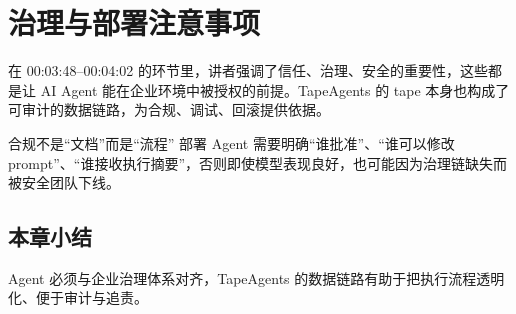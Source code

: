 \section{治理与部署注意事项}
在 00:03:48--00:04:02 的环节里，讲者强调了信任、治理、安全的重要性，这些都是让 AI Agent 能在企业环境中被授权的前提。TapeAgents 的 tape 本身也构成了可审计的数据链路，为合规、调试、回滚提供依据。

\begin{warningbox}{合规不是“文档”而是“流程”}
部署 Agent 需要明确“谁批准”、“谁可以修改 prompt”、“谁接收执行摘要”，否则即使模型表现良好，也可能因为治理链缺失而被安全团队下线。
\end{warningbox}

\subsection{本章小结}
Agent 必须与企业治理体系对齐，TapeAgents 的数据链路有助于把执行流程透明化、便于审计与追责。

